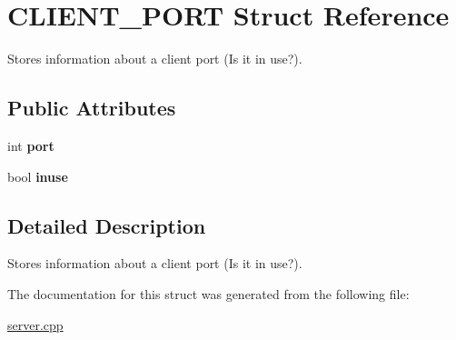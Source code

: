 \hypertarget{structCLIENT__PORT}{
\section{CLIENT\_\-PORT Struct Reference}
\label{structCLIENT__PORT}
}


Stores information about a client port (Is it in use?).  
\subsection*{Public Attributes}
\begin{DoxyCompactItemize}
\item 
\hypertarget{structCLIENT__PORT_a34910af08e0e3ce770de0c00df920e09}{
int {\bfseries port}}
\label{structCLIENT__PORT_a34910af08e0e3ce770de0c00df920e09}

\item 
\hypertarget{structCLIENT__PORT_aa99e0fa5c5746c7d017c6a64223f0c5b}{
bool {\bfseries inuse}}
\label{structCLIENT__PORT_aa99e0fa5c5746c7d017c6a64223f0c5b}

\end{DoxyCompactItemize}


\subsection{Detailed Description}
Stores information about a client port (Is it in use?). 

The documentation for this struct was generated from the following file:\begin{DoxyCompactItemize}
\item 
\hyperlink{server_8cpp}{server.cpp}\end{DoxyCompactItemize}
